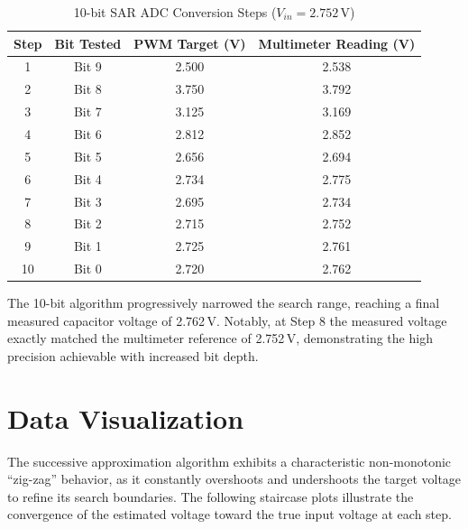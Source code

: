 \documentclass[12pt]{article}
\begin{document}
\begin{table}[H]
    \centering
    \caption{10-bit SAR ADC Conversion Steps ($V_{in} = 2.752$\,V)}
    \label{tab:10bit}
    \begin{tabular}{cccc}
        \toprule
        Step & Bit Tested & PWM Target (V) & Multimeter Reading (V) \\
        \midrule
        1  & Bit 9 & 2.500 & 2.538 \\
        2  & Bit 8 & 3.750 & 3.792 \\
        3  & Bit 7 & 3.125 & 3.169 \\
        4  & Bit 6 & 2.812 & 2.852 \\
        5  & Bit 5 & 2.656 & 2.694 \\
        6  & Bit 4 & 2.734 & 2.775 \\
        7  & Bit 3 & 2.695 & 2.734 \\
        8  & Bit 2 & 2.715 & 2.752 \\
        9  & Bit 1 & 2.725 & 2.761 \\
        10 & Bit 0 & 2.720 & 2.762 \\
        \bottomrule
    \end{tabular}
\end{table}

The 10-bit algorithm progressively narrowed the search range, reaching a final measured capacitor voltage of 2.762\,V. Notably, at Step 8 the measured voltage exactly matched the multimeter reference of 2.752\,V, demonstrating the high precision achievable with increased bit depth.

\newpage

\section{Data Visualization}
The successive approximation algorithm exhibits a characteristic non-monotonic ``zig-zag'' behavior, as it constantly overshoots and undershoots the target voltage to refine its search boundaries. The following staircase plots illustrate the convergence of the estimated voltage toward the true input voltage at each step.
\end{document}
